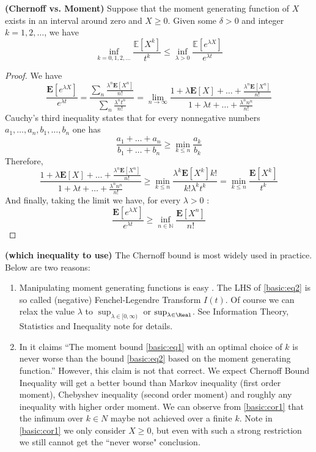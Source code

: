 \documentclass{article}
\newcommand{\bfs}[1]{\textbf{({#1})}}
\begin{document}
\begin{cora}{\bfs{Chernoff vs. Moment}}\label{basic:cor1}
Suppose that the moment generating function of $X$ exists in an interval around zero and $X\geq 0$. Given some $\delta>0$ and integer $k=1,2, \ldots$, we have
$$
\inf _{k=0,1,2, \ldots} \frac{\mathbb{E}\left[X^{k}\right]}{t^{k}} \leq \inf _{\lambda>0} \frac{\mathbb{E}\left[e^{\lambda X}\right]}{e^{\lambda t}}
$$
\end{cora}
\begin{proof}
We have
$$
\frac{\mathbf{E}\left[e^{\lambda X}\right]}{e^{\lambda t}}=\frac{\sum_{n} \frac{\lambda^{n} \mathbf{E}\left[X^{n}\right]}{n !}}{\sum_{n} \frac{\lambda^{n}t^{n}}{n !}}=\lim _{n \rightarrow \infty} \frac{1+\lambda \mathbf{E}[X]+\ldots+\frac{\lambda^{n} \mathbf{E}\left[X^{n}\right]}{n !}}{1+\lambda t+\ldots+\frac{\lambda^{n} n^{n}}{n !}}
$$
Cauchy's third inequality \cite[Exercise 5.1.]{steele2004cauchy} states that for every nonnegative numbers $a_{1}, \ldots, a_{n}, b_{1}, \ldots, b_{n}$ one has
$$
\frac{a_{1}+\ldots+a_{n}}{b_{1}+\ldots+b_{n}} \geqslant \min _{k \leqslant n} \frac{a_{k}}{b_{k}}
$$
Therefore,
$$
\frac{1+\lambda \mathbf{E}[X]+\ldots+\frac{\lambda^{n} \mathbf{E}\left[X^{n}\right]}{n !}}{1+\lambda t+\ldots+\frac{\lambda^{n} n^{n}}{n !}} \geq \min _{k \leq n} \frac{\lambda^{k} \mathbf{E}\left[X^{k}\right] k !}{k ! \lambda^{k} t^{k}}=\min _{k \leq n} \frac{\mathbf{E}\left[X^{k}\right]}{t^{k}}
$$
And finally, taking the limit we have, for every $\lambda>0$ :
$$
\frac{\mathbf{E}\left[e^{\lambda X}\right]}{e^{\lambda t}} \geq \inf _{n \in \mathbb{N}} \frac{\mathbf{E}\left[X^{n}\right]}{n !}
$$
\end{proof}
\begin{rema}{\bfs{which inequality to use}}
The Chernoff bound is most widely used in practice. Below are two reasons:
\begin{enumerate}
    \item Manipulating moment generating functions is easy . The LHS of \cref{basic:eq2} is so called (negative) Fenchel-Legendre Transform $I(t)$. Of course we can relax the value $\lambda$ to $\sup_{\lambda \in[0, \infty)}$ or  $\sup_{\lambda \in\Real}$. See Information Theory, Statistics and Inequality note for details.
    \item In \cite{wainwright2019high} it claims ``The moment bound \cref{basic:eq1} with an optimal choice of $k$ is never worse than the bound \cref{basic:eq2} based on the moment generating function.'' However, this claim is not that correct. We expect Chernoff Bound Inequality will get a better bound than Markov inequality (first order moment), Chebyshev inequality (second order moment) and roughly any inequality with higher order moment. We can observe from \cref{basic:cor1} that the infimum over $k\in N$ maybe not achieved over a finite $k$. Note in \cref{basic:cor1} we only consider $X\ge0$, but even with such a strong restriction we still cannot get the ``never worse" conclusion.
\end{enumerate}
\end{rema}
\end{document}

